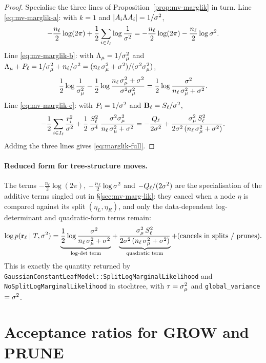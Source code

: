 \begin{proof}
	Specialise the three lines of Proposition~\ref{prop:mv-marglik} in turn.
	Line \eqref{eq:mv-marglik-a}: with $k = 1$ and
	$|A_i\Lambda A_i| = 1/\sigma^{2}$,
	\[
		-\frac{n_\ell}{2}\log(2\pi)
		+ \frac{1}{2}\sum_{i \in I_\ell}\log\frac{1}{\sigma^{2}}
		= -\frac{n_\ell}{2}\log(2\pi) - \frac{n_\ell}{2}\log\sigma^{2} .
	\]
	Line \eqref{eq:mv-marglik-b}: with $\Lambda_{\mu} = 1/\sigma_\mu^{2}$ and
	$\Lambda_{\mu} + P_\ell = 1/\sigma_\mu^{2} + n_\ell/\sigma^{2}
		= (n_\ell\,\sigma_\mu^{2} + \sigma^{2})/(\sigma^{2}\sigma_\mu^{2})$,
	\[
		\frac{1}{2}\log\frac{1}{\sigma_\mu^{2}}
		- \frac{1}{2}\log\frac{n_\ell\,\sigma_\mu^{2} + \sigma^{2}}{\sigma^{2}\sigma_\mu^{2}}
		= \frac{1}{2}\log\frac{\sigma^{2}}{n_\ell\,\sigma_\mu^{2} + \sigma^{2}} .
	\]
	Line \eqref{eq:mv-marglik-c}: with $P_i = 1/\sigma^{2}$ and
	$\mathbf{B}_\ell = S_\ell/\sigma^{2}$,
	\[
		-\frac{1}{2}\sum_{i \in I_\ell}\frac{r_i^2}{\sigma^{2}}
		+ \frac{1}{2}\,\frac{S_\ell^2}{\sigma^4}\,
		\frac{\sigma^{2}\sigma_\mu^{2}}{n_\ell\,\sigma_\mu^{2} + \sigma^{2}}
		= -\frac{Q_\ell}{2\sigma^{2}}
		+ \frac{\sigma_\mu^{2}\, S_\ell^{2}}{2\sigma^{2}\,(n_\ell\,\sigma_\mu^{2} + \sigma^{2})} .
	\]
	Adding the three lines gives \eqref{eq:marglik-full}.
\end{proof}

\paragraph{Reduced form for tree-structure moves.}
The terms $-\frac{n_\ell}{2}\log(2\pi)$, $-\frac{n_\ell}{2}\log\sigma^{2}$ and
$-Q_\ell/(2\sigma^{2})$ are the specialisation of the additive terms singled out
in \S\ref{sec:mv-marg-lik}: they cancel when a node $\eta$ is compared
against its split $(\eta_L, \eta_R)$, and only the data-dependent
log-determinant and quadratic-form terms remain:
\begin{equation}
	\label{eq:reduced-marglik}
	\log p(\mathbf{r}_\ell \mid T, \sigma^{2}) =
	\underbrace{\frac{1}{2}\log\frac{\sigma^{2}}{n_\ell\,\sigma_\mu^{2} + \sigma^{2}}}_{\text{log-det term}}
	+ \underbrace{\frac{\sigma_\mu^{2}\, S_\ell^{2}}{2\sigma^{2}\,(n_\ell\,\sigma_\mu^{2} + \sigma^{2})}}_{\text{quadratic term}}
	+ (\text{cancels in splits / prunes}).
\end{equation}
This is exactly the quantity returned by
\texttt{GaussianConstantLeafModel::SplitLogMarginalLikelihood} and
\texttt{NoSplitLogMarginalLikelihood} in stochtree, with $\tau = \sigma_\mu^{2}$ and
\texttt{global\_variance} $= \sigma^{2}$.

\section{Acceptance ratios for GROW and PRUNE}
\label{sec:lkratios}

